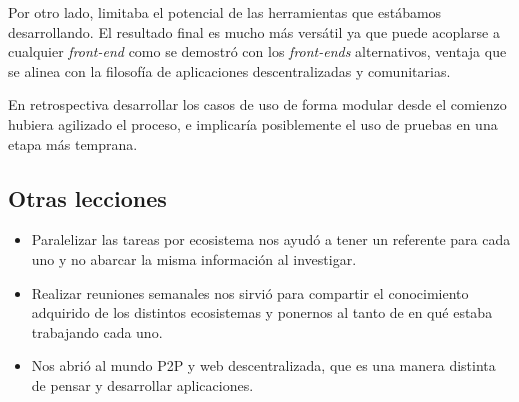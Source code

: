 Por otro lado, limitaba el potencial de las herramientas que estábamos desarrollando. El resultado final es mucho más versátil ya que puede acoplarse a cualquier \textit{front-end} como se demostró con los \textit{front-ends} alternativos, ventaja que se alinea con la filosofía de aplicaciones descentralizadas y comunitarias.

En retrospectiva desarrollar los casos de uso de forma modular desde el comienzo hubiera agilizado el proceso, e implicaría posiblemente el uso de pruebas en una etapa más temprana.

\subsection{Otras lecciones}

\begin{itemize}
    \item Paralelizar las tareas por ecosistema nos ayudó a tener un referente para cada uno y no abarcar la misma información al investigar.

    \item Realizar reuniones semanales nos sirvió para compartir el conocimiento adquirido de los distintos ecosistemas y ponernos al tanto de en qué estaba trabajando cada uno.

    \item Nos abrió al mundo P2P y web descentralizada, que es una manera distinta de pensar y desarrollar aplicaciones.

\end{itemize}